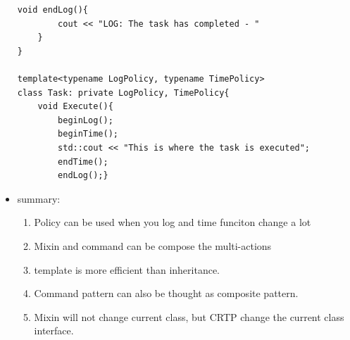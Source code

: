 \documentclass[a4paper,11pt,twoside]{book}
\begin{document}
\begin{itemize}
\begin{lstlisting}[numbers=none]
	void endLog(){
		cout << "LOG: The task has completed - "
	}
}
	
template<typename LogPolicy, typename TimePolicy>
class Task: private LogPolicy, TimePolicy{
	void Execute(){
		beginLog();
		beginTime();
		std::cout << "This is where the task is executed";
		endTime();
		endLog();}
\end{lstlisting}
	
	\item summary:
	\begin{enumerate}
		\item Policy can be used when you log and time funciton change a lot
		\item Mixin and command can be compose the multi-actions
		\item template is more efficient than inheritance. 
		\item Command pattern can also be thought as composite pattern.
		\item Mixin will not change current class, but CRTP change the current class interface.
	\end{enumerate}
	
\end{itemize}
\end{document}
